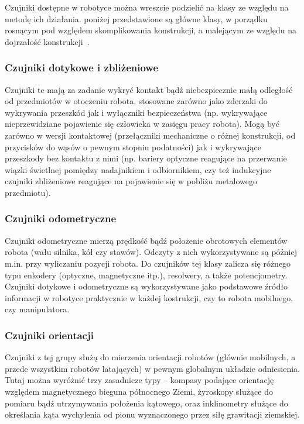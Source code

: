 Czujniki dostępne w robotyce można wreszcie podzielić na klasy ze względu
na metodę ich działania. poniżej przedstawione są główne klasy, w porządku
rosnącym pod względem skomplikowania konstrukcji, a malejącym ze względu na
dojrzałość konstrukcji~\cite{siegwart}.

\subsubsection{Czujniki dotykowe i zbliżeniowe}

Czujniki te mają za zadanie wykryć kontakt bądź niebezpiecznie małą odległość
od przedmiotów w otoczeniu robota, stosowane zarówno jako zderzaki do wykrywania
przeszkód jak i wyłączniki bezpieczeństwa (np. wykrywające nieprzewidziane
pojawienie się człowieka w zasięgu pracy robota). Mogą być zarówno w wersji
kontaktowej (przełączniki mechaniczne o różnej konstrukcji, od przycisków
do wąsów o pewnym stopniu podatności) jak i wykrywające przeszkody bez
kontaktu z nimi (np. bariery optyczne reagujące na przerwanie wiązki świetlnej
pomiędzy nadajnikiem i odbiornikiem, czy też indukcyjne czujniki zbliżeniowe
reagujące na pojawienie się w pobliżu metalowego przedmiotu).

\subsubsection{Czujniki odometryczne}

Czujniki odometryczne mierzą prędkość bądź położenie obrotowych elementów
robota (wału silnika, kół czy stawów). Odczyty z nich wykorzystywane są
później m.in. przy wyliczaniu pozycji robota. Do czujników tej klasy zalicza się
różnego typu enkodery (optyczne, magnetyczne itp.), resolwery, a także potencjometry.
Czujniki dotykowe i odometryczne są wykorzystywane jako podstawowe źródło
informacji w robotyce praktycznie w każdej kostrukcji, czy to robota mobilnego,
czy manipulatora.

\subsubsection{Czujniki orientacji}

Czujniki z tej grupy służą do mierzenia orientacji robotów (głównie mobilnych,
a przede wszystkim robotów latających) w pewnym globalnym układzie odniesienia.
Tutaj można wyróżnić trzy zasadnicze typy -- kompasy podające orientację
względem magnetycznego bieguna północnego Ziemi, żyroskopy służące do pomiaru
bądź utrzymywania położenia kątowego, oraz inklinometry służące do określania
kąta wychylenia od pionu wyznaczonego przez siłę grawitacji ziemskiej.

